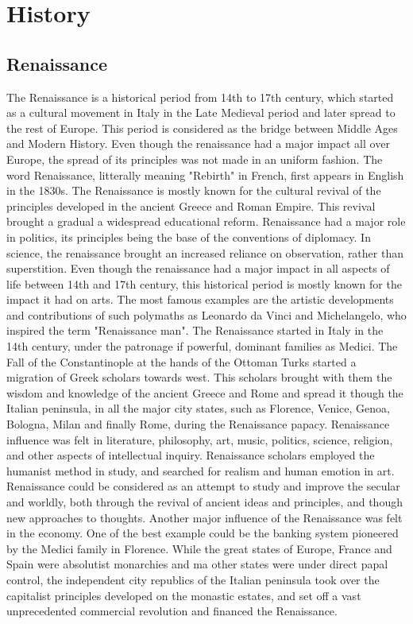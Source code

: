 
\section{History}


\subsection{Renaissance}

The Renaissance is a historical period from 14th to 17th century, which started as a cultural movement in Italy in the Late Medieval period and later spread to the rest of Europe. This period is considered as the bridge between Middle Ages and Modern History. Even though the renaissance had a major impact all over Europe, the spread of its principles was not made in an uniform fashion. The word Renaissance, litterally meaning "Rebirth" in French, first appears in English in the 1830s.
The Renaissance is mostly known for the cultural revival of the principles developed in the ancient Greece and Roman Empire. This revival brought a gradual a widespread educational reform.
Renaissance had a major role  in politics, its principles being the base of the conventions of diplomacy. In science, the renaissance brought an increased reliance on observation, rather than superstition.
Even though the renaissance had a major impact in all aspects of life between 14th and 17th century, this historical period is mostly known for the impact it had on arts. The most famous examples are the artistic developments and contributions of such polymaths as Leonardo da Vinci and Michelangelo, who inspired the term "Renaissance man".
The Renaissance started in Italy in the 14th century, under the patronage if powerful, dominant families as Medici. The Fall of the Constantinople at the hands of the Ottoman Turks started a migration of Greek scholars towards west. This scholars brought with them the wisdom and knowledge of the ancient Greece and Rome and spread it though the Italian peninsula, in all the major city states, such as Florence, Venice, Genoa, Bologna, Milan and finally Rome, during the Renaissance papacy.
Renaissance influence was felt in literature, philosophy, art, music, politics, science, religion, and other aspects of intellectual inquiry. Renaissance scholars employed the humanist method in study, and searched for realism and human emotion in art.
Renaissance could be considered as an attempt to study and improve the secular and worldly, both through the revival of ancient ideas and principles, and though new approaches to thoughts.
Another major influence of the Renaissance was felt in the economy. One of the best example could be the banking system pioneered by the Medici family in Florence. While the great states of Europe, France and Spain were absolutist monarchies and ma other states were under direct papal control, the independent city republics of the Italian peninsula took over the capitalist principles developed on the monastic estates, and set off a vast unprecedented commercial revolution and financed the Renaissance.

